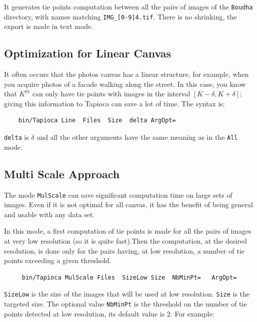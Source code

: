 It generates tie points computation between all the pairs of images of the {\tt Boudha} directory,
with names matching {\tt IMG\_[0-9]{4}.tif}. There is no shrinking, the export is
made in text mode.


\subsection{Optimization for Linear Canvas}

It often occurs that the photos canvas  has a linear structure, for example, when you acquire
photos of a facade walking  along the street.   In this case, you
know that $K^{th}$  can only have tie points
with images in the interval $[K-\delta,K+\delta]$; giving this information
to Tapioca can save a lot of time. The syntax is:

{\scriptsize
\begin{verbatim}
    bin/Tapioca Line  Files  Size  delta ArgOpt=
\end{verbatim}
}

{\tt delta} is $\delta$ and all the other arguments have the same meaning as in the
 {\tt All} mode.


\subsection{Multi Scale Approach}


The mode  {\tt MulScale} can save  significant computation time on large sets of images.
Even if it is not optimal for all canvas, it has the benefit of being general
and usable with any data set.

In this mode, a first computation of tie points is made for all the pairs
of images at very low resolution (so it is quite fast).Then the
computation, at the desired resolution, is done  only for the pairs
having, at low resolution, a number  of tie points exceeding a given
threshold.



{\scriptsize
\begin{verbatim}
     bin/Tapioca MulScale Files  SizeLow Size  NbMinPt=   ArgOpt=
\end{verbatim}
}

{\tt SizeLow} is the size of the images that will be used at low resolution.
{\tt Size} is the targeted size.  The optional value {\tt NbMinPt}
is the threshold on the number of tie points detected at low resolution,
its default value is $2$. For example:

